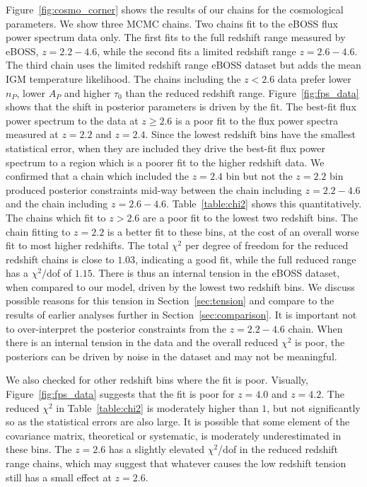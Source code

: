 Figure~\ref{fig:cosmo_corner} shows the results of our chains for the cosmological parameters. We show three MCMC chains. Two chains fit to the eBOSS flux power spectrum data only. The first fits to the full redshift range measured by eBOSS, $z=2.2 - 4.6$, while the second fits a limited redshift range $z=2.6 - 4.6$. The third chain uses the limited redshift range eBOSS dataset but adds the mean IGM temperature likelihood. The chains including the $z < 2.6$ data prefer lower $n_P$, lower $A_P$ and higher $\tau_0$ than the reduced redshift range. Figure~\ref{fig:fps_data} shows that the shift in posterior parameters is driven by the fit. The best-fit flux power spectrum to the data at $z \geq 2.6$ is a poor fit to the flux power spectra measured at $z=2.2$ and $z=2.4$. Since the lowest redshift bins have the smallest statistical error, when they are included they drive the best-fit flux power spectrum to a region which is a poorer fit to the higher redshift data. We confirmed that a chain which included the $z=2.4$ bin but not the $z=2.2$ bin produced posterior constraints mid-way between the chain including $z=2.2 - 4.6$ and the chain including $z=2.6 - 4.6$. Table~\ref{table:chi2} shows this quantitatively. The chains which fit to $z > 2.6$ are a poor fit to the lowest two redshift bins. The chain fitting to $z=2.2$ is a better fit to these bins, at the cost of an overall worse fit to most higher redshifts. The total $\chi^2$ per degree of freedom for the reduced redshift chains is close to $1.03$, indicating a good fit, while the full reduced range has a $\chi^2/$dof of $1.15$. 
There is thus an internal tension in the eBOSS dataset, when compared to our model, driven by the lowest two redshift bins. We discuss possible reasons for this tension in Section~\ref{sec:tension} and compare to the results of earlier analyses further in Section~\ref{sec:comparison}. It is important not to over-interpret the posterior constraints from the $z=2.2 - 4.6$ chain. When there is an internal tension in the data and the overall reduced $\chi^2$ is poor, the posteriors can be driven by noise in the dataset and may not be meaningful.

We also checked for other redshift bins where the fit is poor. Visually, Figure~\ref{fig:fps_data} suggests that the fit is poor for $z=4.0$ and $z=4.2$. The reduced $\chi^2$ in Table~\ref{table:chi2} is moderately higher than $1$, but not significantly so as the statistical errors are also large. It is possible that some element of the covariance matrix, theoretical or systematic, is moderately underestimated in these bins. The $z=2.6$ has a slightly elevated $\chi^2$/dof in the reduced redshift range chains, which may suggest that whatever causes the low redshift tension still has a small effect at $z=2.6$. 

